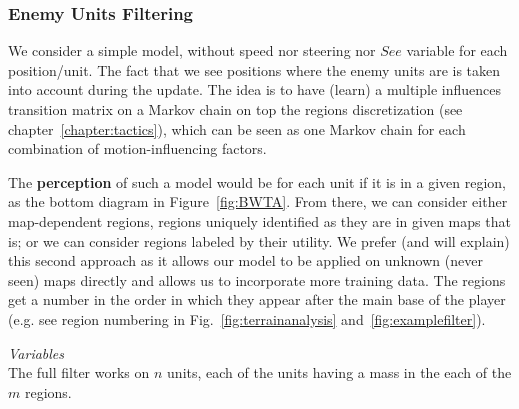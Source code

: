 \subsubsection{Enemy Units Filtering}
We consider a simple model, without speed nor steering nor $See$ variable for each position/unit. The fact that we see positions where the enemy units are is taken into account during the update.
The idea is to have (learn) a multiple influences transition matrix on a Markov chain on top the regions discretization (see chapter~\ref{chapter:tactics}), which can be seen as one Markov chain for each combination of motion-influencing factors.

The \textbf{perception} of such a model would be for each unit if it is in a given region, as the bottom diagram in Figure~\ref{fig:BWTA}. From there, we can consider either map-dependent regions, regions uniquely identified as they are in given maps that is; or we can consider regions labeled by their utility. We prefer (and will explain) this second approach as it allows our model to be applied on unknown (never seen) maps directly and allows us to incorporate more training data. The regions get a number in the order in which they appear after the main base of the player (e.g. see region numbering in Fig.~\ref{fig:terrainanalysis} and~\ref{fig:examplefilter}). %

\vspace{0.3cm}
\textit{Variables}\\
\vspace{0.5cm}
The full filter works on $n$ units, each of the units having a mass in the each of the $m$ regions.

